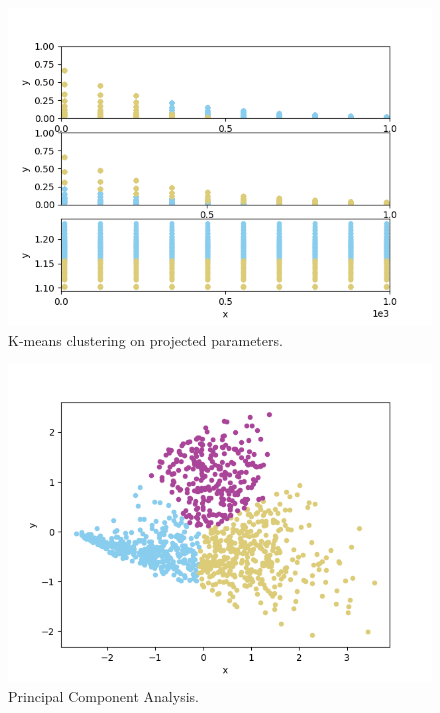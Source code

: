  \begin{figure}[h!]
  \centering
  \includegraphics[scale=0.7]{../../tests/framework/user_guide/DataMining/gold/dataMiningAnalysis/1-PlotKMeans1_dataMining-dataMining-dataMining.png}
  \caption{K-means clustering on projected parameters.}
  \label{fig:KmeanProjected}
 \end{figure}

 \begin{figure}[h!]
  \centering
  \includegraphics[scale=0.7]{../../tests/framework/user_guide/DataMining/gold/dataMiningAnalysis/1-PlotPCA1_dataMining.png}
  \caption{Principal Component Analysis.}
  \label{fig:PCAplot}
 \end{figure}

